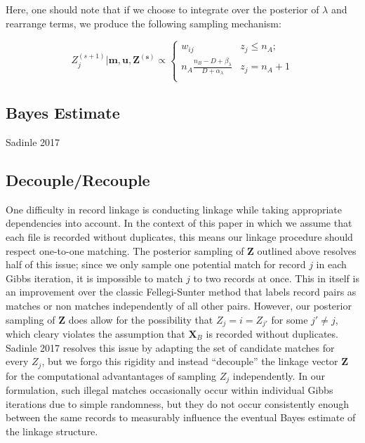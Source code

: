 \documentclass[
  12pt,
]{article}
\begin{document}
Here, one should note that if we choose to integrate over the posterior
of \(\lambda\) and rearrange terms, we produce the following sampling
mechanism:

\[Z_j^{(s+1)} | \mathbf{m}, \mathbf{u}, \mathbf{Z^{(s)}} \propto
\begin{cases} 
    w_{ij}  & z_j \leq n_A; \\
     n_A \frac{n_B - D + \beta_{\lambda}}{D + \alpha_{\lambda}} &  z_j  = n_A + 1 \\
\end{cases}\]

\newpage

\hypertarget{bayes-estimate}{%
\subsection{Bayes Estimate}\label{bayes-estimate}}

Sadinle 2017

\hypertarget{decouplerecouple}{%
\subsection{Decouple/Recouple}\label{decouplerecouple}}

One difficulty in record linkage is conducting linkage while taking
appropriate dependencies into account. In the context of this paper in
which we assume that each file is recorded without duplicates, this
means our linkage procedure should respect one-to-one matching. The
posterior sampling of \(\mathbf{Z}\) outlined above resolves half of
this issue; since we only sample one potential match for record \(j\) in
each Gibbs iteration, it is impossible to match \(j\) to two records at
once. This in itself is an improvement over the classic Fellegi-Sunter
method that labels record pairs as matches or non matches independently
of all other pairs. However, our posterior sampling of \(\mathbf{Z}\)
does allow for the possibility that \(Z_j = i = Z_{j'}\) for some
\(j' \neq j\), which cleary violates the assumption that
\(\mathbf{X}_B\) is recorded without duplicates. Sadinle 2017 resolves
this issue by adapting the set of candidate matches for every \(Z_j\),
but we forgo this rigidity and instead ``decouple'' the linkage vector
\(\mathbf{Z}\) for the computational advantantages of sampling \(Z_j\)
independently. In our formulation, such illegal matches occasionally
occur within individual Gibbs iterations due to simple randomness, but
they do not occur consistently enough between the same records to
measurably influence the eventual Bayes estimate of the linkage
structure.
\end{document}
